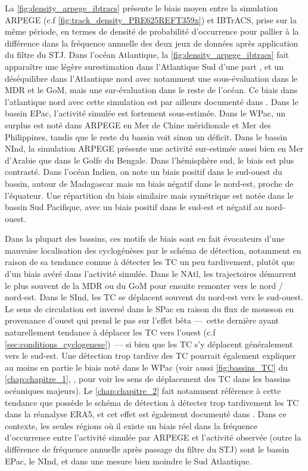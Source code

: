 \documentclass[../main.tex]{subfiles}
\begin{document}
La \cref{fig:density_arpege_ibtracs} présente le biais moyen entre la simulation ARPEGE (c.f \cref{fig:track_density_PRE625REFT359x}) et IBTrACS, prise sur la
même période, en termes de densité de probabilité d'occurrence pour pallier à la différence dans la fréquence annuelle des deux jeux de données après
application du filtre du STJ. Dans l'océan Atlantique, la \cref{fig:density_arpege_ibtracs} fait apparaître une légère surestimation dans l'Atlantique Sud d'une
part \parencite[un biais commun à de nombreux modèles,][]{camargo_tropical_2016}, et un déséquilibre dans l'Atlantique nord avec notamment une sous-évaluation dans
le MDR et le GoM, mais une sur-évaluation dans le reste de l'océan. Ce biais dans l'atlantique nord avec cette simulation est par ailleurs documenté dans
\textcite{chauvin_future_2020}. Dans le bassin EPac, l'activité simulée est fortement sous-estimée. Dans le WPac, un surplus est noté dans ARPEGE en Mer de
Chine méridionale et Mer des Philippines, tandis que le reste du bassin voit sinon un déficit. Dans le bassin NInd, la simulation ARPEGE présente une activité
sur-estimée aussi bien en Mer d'Arabie que dans le Golfe du Bengale. Dans l'hémisphère sud, le biais est plus contrasté. Dans l'océan Indien, on note un biais
positif dans le sud-ouest du bassin, autour de Madagascar mais un biais négatif dans le nord-est, proche de l'équateur. Une répartition du biais similaire mais
symétrique est notée dans le bassin Sud Pacifique, avec un biais positif dans le sud-est et négatif au nord-ouest.

Dans la plupart des bassins, ces motifs de biais sont en fait évocateurs d'une mauvaise localisation des cyclogénèses par le schéma de détection, notamment en
raison de sa tendance connue à détecter les TC un peu tardivement, plutôt que d'un biais avéré dans l'activité simulée. Dans le NAtl, les trajectoires démarrent
le plus souvent de la MDR ou du GoM pour ensuite remonter vers le nord / nord-est. Dans le SInd, les TC se déplacent souvent du nord-est vers le sud-ouest. Le
sens de circulation est inversé dans le SPac en raison du flux de mousson en provenance d'ouest qui prend le pas sur l'effet bêta ---~cette dernière ayant
naturellement tendance à déplacer les TC vers l'ouest (c.f \cref{sec:conditions_cyclogenese})~--- si bien que les TC s'y déplacent généralement vers le sud-est.
Une détection trop tardive des TC pourrait également expliquer au moins en partie le biais noté dans le WPac (voir aussi \cref{fig:bassins_TC} du
\cref{chap:chapitre_1}, , pour voir les sens de déplacement des TC dans les bassins océaniques majeurs). Le \cref{chap:chapitre_2} fait
notamment référence à cette tendance que possède le schéma de détection à détecter trop tardivement les TC dans la réanalyse ERA5, et cet effet est également
documenté dans \textcite{bourdin_intercomparison_2022}. Dans ce contexte, les seules régions où il existe un biais réel dans la fréquence d'occurrence entre
l'activité simulée par ARPEGE et l'activité observée (outre la différence de fréquence annuelle après passage du filtre du STJ) sont le bassin EPac, le NInd, et
dans une mesure bien moindre le Sud Atlantique.
\end{document}

